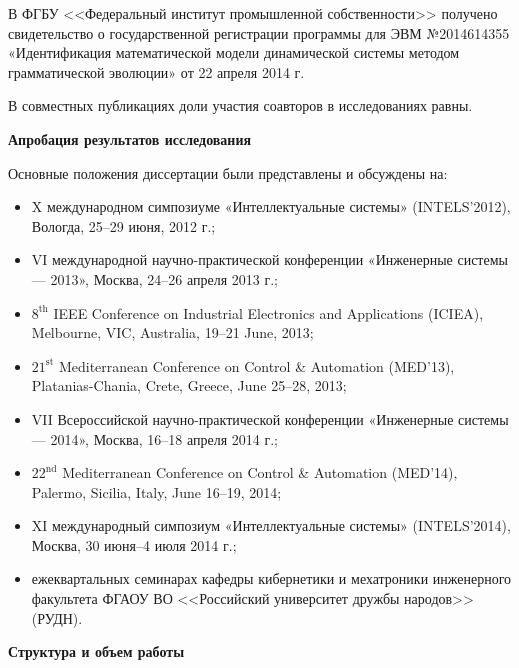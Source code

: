 В ФГБУ <<Федеральный институт промышленной собственности>> получено свидетельство о государственной регистрации программы для ЭВМ №2014614355 «Идентификация математической модели динамической системы методом грамматической эволюции» от 22 апреля 2014 г.

В совместных публикациях доли участия соавторов в исследованиях равны.

\textbf{Апробация результатов исследования}

Основные положения диссертации были представлены и обсуждены на:
\begin{itemize}
    \item X международном симпозиуме «Интеллектуальные системы» (INTELS'2012), Вологда, 25--29 июня, 2012 г.;
    \item VI международной научно-практической конференции «Инженерные системы — 2013», Москва, 24--26 апреля 2013 г.;
    \item $8^{\text{th}}$ IEEE Conference on Industrial Electronics and Applications (ICIEA), Melbourne, VIC, Australia, 19--21 June, 2013;
    \item $21^{\text{st}}$ Mediterranean Conference on Control \& Automation (MED'13), Platanias-Chania, Crete, Greece, June 25--28, 2013;
    \item VII Всероссийской научно-практической конференции «Инженерные системы — 2014», Москва, 16--18 апреля 2014 г.;
    \item $22^{\text{nd}}$ Mediterranean Conference on Control \& Automation (MED'14), Palermo, Sicilia, Italy, June 16--19, 2014;
    \item XI международный симпозиум «Интеллектуальные системы» (INTELS'2014), Москва, 30 июня--4 июля 2014 г.;
    \item ежеквартальных семинарах кафедры кибернетики и мехатроники инженерного факультета ФГАОУ ВО <<Российский университет дружбы народов>> (РУДН).
\end{itemize}

\textbf{Структура и объем работы}

\clearpage